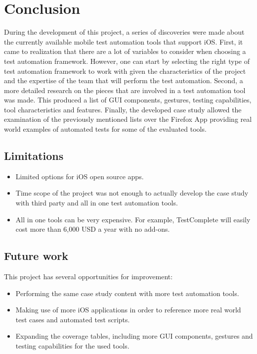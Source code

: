 \chapter{Conclusion}
\label{chapter5}

During the development of this project, a series of discoveries were made about the currently available mobile test automation tools that support iOS. First, it came to realization that there are a lot of variables to consider when choosing a test automation framework. However, one can start by selecting the right type of test automation framework to work with given the characteristics of the project and the expertise of the team that will perform the test automation. Second, a more detailed research on the pieces that are involved in a test automation tool was made. This produced a list of GUI components, gestures, testing capabilities, tool characteristics and features. Finally, the developed case study allowed the examination of the previously mentioned lists over the Firefox App providing real world examples of automated tests for some of the evaluated tools.

\section{Limitations}
	\begin{itemize}
		\item Limited options for iOS open source apps.
		\item Time scope of the project was not enough to actually develop the case study with third party and all in one test automation tools.
		\item All in one tools can be very expensive. For example, TestComplete will easily cost more than 6,000 USD a year with no add-ons.
	\end{itemize}


\section{Future work}

This project has several opportunities for improvement:

	\begin{itemize}
		\item Performing the same case study content with more test automation tools. 
		\item Making use of more iOS applications in order to reference more real world test cases and automated test scripts.
		\item Expanding the coverage tables, including more GUI components, gestures and testing capabilities for the used tools.
	\end{itemize}

